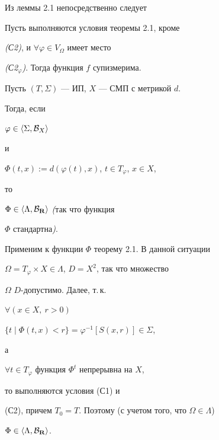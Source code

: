 Из леммы 2.1 непосредственно следует





\begin{thms} Пусть выполняются условия теоремы 2.1, кроме


{\em (С2)}, и $\forall\varphi\in V_\Omega$ имеет место


{\em (С2${}_\varphi$)}. Тогда функция $f$ супизмерима.


\end{thms}





\begin{thms} Пусть $(T,\Sigma)$ --- ИП, $X$ --- СМП с метрикой $d$.


Тогда, если


$\varphi\in\langle \Sigma ,{\cal B}_X\rangle $


и


$\Phi(t,x):=d(\varphi(t),x)$, $t\in T_\varphi$, $x\in X$,


то


$\Phi\in\langle \Lambda,{\cal B}_{\bold R}\rangle$ {\em (}так что функция


$\Phi$ стандартна{\em)}.


\end{thms}





\begin{pf} Применим к функции $\Phi$ теорему 2.1. В данной ситуации


$\Omega=T_\varphi\times X\in\Lambda$, $D=X^2$, так что множество


$\Omega$\; $D$-допустимо. Далее, т.\,к.


$\forall(x\in X,\:r>0)$ \;


$\{t\mid \Phi(t,x)<r\}=\varphi^{-1}[S(x,r)]\in\Sigma$,


а


$\forall t\in T_\varphi$ функция $\Phi^t$ непрерывна на $X$,


то выполняются условия (С1) и


(С2), причем $T_0=T$. Поэтому (с учетом того, что $\Omega\in\Lambda$)


$\Phi\in\langle \Lambda ,{\cal B}_{\bold R}\rangle $.


\end{pf}





